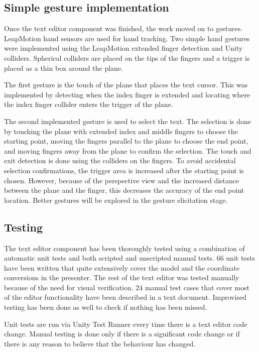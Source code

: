 \documentclass[a4paper, 12pt]{article}
\begin{document}
\vspace{-0.3cm}
\subsection{Simple gesture implementation}

Once the text editor component was finished, the work moved on to gestures. LeapMotion hand sensors are used for hand tracking. Two simple hand gestures were implemented using the LeapMotion extended finger detection and Unity colliders. Spherical colliders are placed on the tips of the fingers and a trigger is placed as a thin box around the plane.

The first gesture is the touch of the plane that places the text cursor. This was implemented by detecting when the index finger is extended and locating where the index finger collider enters the trigger of the plane.

The second implemented gesture is used to select the text. The selection is done by touching the plane with extended index and middle fingers to choose the starting point, moving the fingers parallel to the plane to choose the end point, and moving fingers away from the plane to confirm the selection. The touch and exit detection is done using the colliders on the fingers. To avoid accidental selection confirmations, the trigger area is increased after the starting point is chosen. However, because of the perspective view and the increased distance between the plane and the finger, this decreases the accuracy of the end point location. Better gestures will be explored in the gesture elicitation stage.

\vspace{-0.3cm}
\subsection{Testing}

The text editor component has been thoroughly tested using a combination of automatic unit tests and both scripted and unscripted manual tests. 66 unit tests have been written that quite extensively cover the model and the coordinate conversions in the presenter. The rest of the text editor was tested manually because of the need for visual verification. 24 manual test cases that cover most of the editor functionality have been described in a text document. Improvised testing has been done as well to check if nothing has been missed.

Unit tests are run via Unity Test Runner every time there is a text editor code change. Manual testing is done only if there is a significant code change or if there is any reason to believe that the behaviour has changed.
\end{document}
